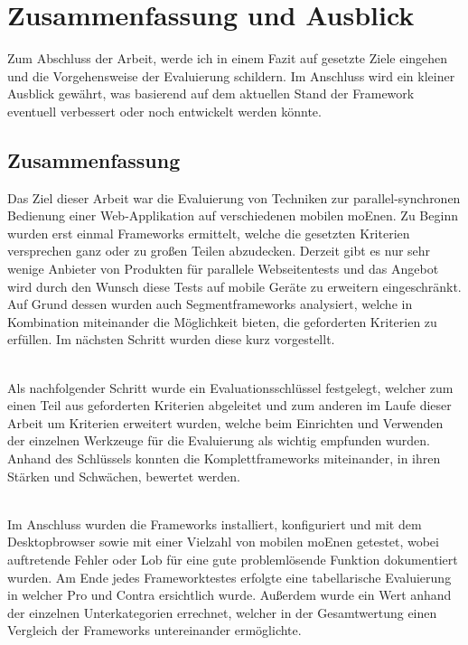 \chapter{Zusammenfassung und Ausblick}
Zum Abschluss der Arbeit, werde ich in einem Fazit auf gesetzte Ziele eingehen und die Vorgehensweise der Evaluierung schildern. Im Anschluss wird ein kleiner Ausblick gewährt, was basierend auf dem aktuellen Stand der \Gls{Framework} eventuell verbessert oder noch entwickelt werden könnte.

\section{Zusammenfassung}
Das Ziel dieser Arbeit war die Evaluierung von Techniken zur
parallel-synchronen Bedienung einer
Web-Applikation auf verschiedenen
mobilen \Gls{moEn}en. Zu Beginn wurden erst einmal \Gls{Framework}s ermittelt, welche die gesetzten Kriterien versprechen ganz oder zu großen Teilen abzudecken. 
Derzeit gibt es nur sehr wenige Anbieter von Produkten für parallele Webseitentests und das Angebot wird durch den Wunsch diese Tests auf mobile Geräte zu erweitern eingeschränkt. Auf Grund dessen wurden auch Segmentframeworks analysiert, welche in Kombination miteinander die Möglichkeit bieten, die geforderten Kriterien zu erfüllen. Im nächsten Schritt wurden diese kurz vorgestellt.

\\Als nachfolgender Schritt wurde ein Evaluationsschlüssel festgelegt, welcher zum einen Teil aus geforderten Kriterien abgeleitet und zum anderen im Laufe dieser Arbeit um Kriterien erweitert wurden, welche beim Einrichten und Verwenden der einzelnen Werkzeuge für die Evaluierung als wichtig empfunden wurden. Anhand des Schlüssels konnten die Komplettframeworks miteinander, in ihren Stärken und Schwächen, bewertet werden.

\\Im Anschluss wurden die \Gls{Framework}s installiert, konfiguriert und mit dem Desktopbrowser sowie mit einer Vielzahl von mobilen \Gls{moEn}en getestet, wobei auftretende Fehler oder Lob für eine gute problemlösende Funktion dokumentiert wurden. Am Ende jedes \Gls{Framework}testes erfolgte eine tabellarische Evaluierung in welcher Pro und Contra ersichtlich wurde. Außerdem wurde ein Wert anhand der einzelnen Unterkategorien errechnet, welcher in der Gesamtwertung einen Vergleich der \Gls{Framework}s untereinander ermöglichte.

